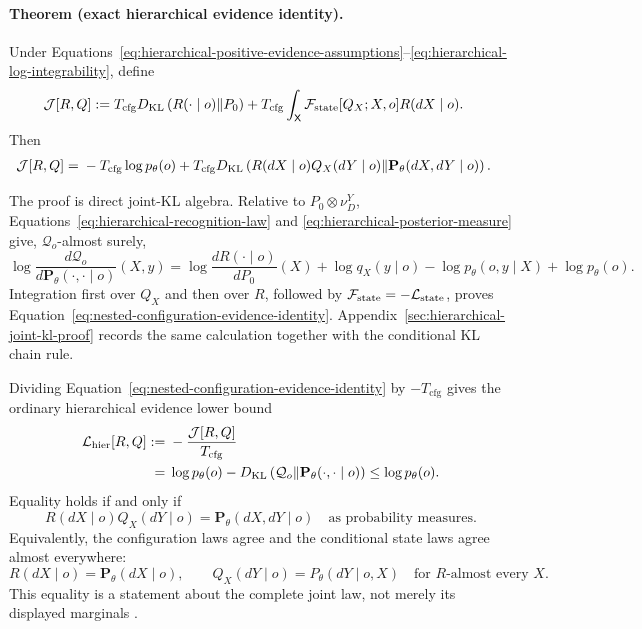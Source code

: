 \paragraph{Theorem (exact hierarchical evidence identity).}
Under Equations~\eqref{eq:hierarchical-positive-evidence-assumptions}--\eqref{eq:hierarchical-log-integrability}, define
\begin{align}
\mathcal J[R,Q]
:={}&T_{\mathrm{cfg}}
D_{\mathrm{KL}}\left(R(\mathord\cdot\mid o)\middle\Vert P_0\right)
+T_{\mathrm{cfg}}
\int_{\mathsf X}
\mathcal F_{\mathrm{state}}[Q_X;X,o]R(dX\mid o).
\label{eq:nested-configuration-objective}
\end{align}
Then
\begin{align}
\mathcal J[R,Q]
={}&-T_{\mathrm{cfg}}\log p_\theta(o)
+T_{\mathrm{cfg}}
D_{\mathrm{KL}}\left(
R(dX\mid o)Q_X(dY\mid o)
\middle\Vert
\mathbf P_\theta(dX,dY\mid o)
\right).
\label{eq:nested-configuration-evidence-identity}
\end{align}

The proof is direct joint-KL algebra. Relative to \(P_0\otimes\nu_D^Y\), Equations~\eqref{eq:hierarchical-recognition-law} and \eqref{eq:hierarchical-posterior-measure} give, \(\mathcal Q_o\)-almost surely,
\begin{equation}
\log\frac{d\mathcal Q_o}
{d\mathbf P_\theta(\mathord\cdot,\mathord\cdot\mid o)}(X,y)
=\log\frac{dR(\mathord\cdot\mid o)}{dP_0}(X)
+\log q_X(y\mid o)
-\log p_\theta(o,y\mid X)
+\log p_\theta(o).
\label{eq:hierarchical-joint-log-ratio}
\end{equation}
Integration first over \(Q_X\) and then over \(R\), followed by
\(\mathcal F_{\mathrm{state}}=-\mathcal L_{\mathrm{state}}\), proves Equation~\eqref{eq:nested-configuration-evidence-identity}. Appendix~\ref{sec:hierarchical-joint-kl-proof} records the same calculation together with the conditional KL chain rule.

Dividing Equation~\eqref{eq:nested-configuration-evidence-identity} by \(-T_{\mathrm{cfg}}\) gives the ordinary hierarchical evidence lower bound
\begin{align}
\mathcal L_{\mathrm{hier}}[R,Q]
:={}&-\frac{\mathcal J[R,Q]}{T_{\mathrm{cfg}}}
\label{eq:hierarchical-elbo-definition}\\
={}&\log p_\theta(o)
-D_{\mathrm{KL}}\left(
\mathcal Q_o
\middle\Vert
\mathbf P_\theta(\mathord\cdot,\mathord\cdot\mid o)
\right)
\leq\log p_\theta(o).
\label{eq:hierarchical-elbo-gap}
\end{align}
Equality holds if and only if
\begin{equation}
R(dX\mid o)Q_X(dY\mid o)
=\mathbf P_\theta(dX,dY\mid o)
\quad\text{as probability measures}.
\label{eq:hierarchical-elbo-equality-condition}
\end{equation}
Equivalently, the configuration laws agree and the conditional state laws agree almost everywhere:
\begin{equation}
R(dX\mid o)=\mathbf P_\theta(dX\mid o),
\qquad
Q_X(dY\mid o)=P_\theta(dY\mid o,X)
\quad\text{for \(R\)-almost every \(X\)}.
\label{eq:hierarchical-elbo-component-equality}
\end{equation}
This equality is a statement about the complete joint law, not merely its displayed marginals \citep{Kullback1951,Csiszar1967,CoverThomas2006}.

